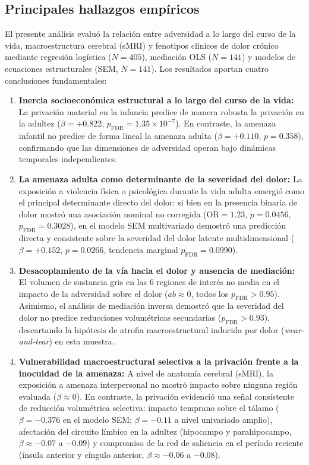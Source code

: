 \documentclass[11pt,a4paper]{article}
\begin{document}
\subsection{Principales hallazgos empíricos}
El presente análisis evaluó la relación entre adversidad a lo largo del curso de la vida, macroestructura cerebral (sMRI) y fenotipos clínicos de dolor crónico 
mediante regresión logística ($N = 405$), mediación OLS ($N = 141$) y modelos de ecuaciones estructurales (SEM, $N = 141$). Los resultados aportan cuatro conclusiones 
fundamentales: 
\begin{enumerate}
  \item \textbf{Inercia socioeconómica estructural a lo largo del curso de la vida:} La privación material en la infancia predice de manera robusta la privación en la 
  adultez ($\beta = +0.822$, $p_{\text{FDR}} = 1.35 \times 10^{-7}$). En contraste, la amenaza infantil no predice de forma lineal la amenaza adulta ($\beta = +0.110$, $p = 0.358$),
  confirmando que las dimensiones de adversidad operan bajo dinámicas temporales independientes. 
  \item \textbf{La amenaza adulta como determinante de la severidad del dolor:} La exposición a violencia física o psicológica durante la vida adulta emergió como el 
  principal determinante directo del dolor: si bien en la presencia binaria de dolor mostró una asociación nominal no corregida ($\text{OR} = 1.23$, $p = 0.0456$, $p_{\text{FDR}} = 0.3028$),
  en el modelo SEM multivariado demostró una predicción directa y consistente sobre la severidad del dolor latente multidimensional ($\beta = +0.152$, $p = 0.0266$, tendencia marginal $p_{\text{FDR}} = 0.0990$).
  \item \textbf{Desacoplamiento de la vía hacia el dolor y ausencia de mediación:} El volumen de sustancia gris en las 6 regiones de interés no media en el impacto de la adversidad sobre el dolor ($ab \approx 0$, todos los $p_{\text{FDR}} > 0.95$).
  Asimismo, el análisis de mediación inversa demostró que la severidad del dolor no predice reducciones volumétricas secundarias ($p_{\text{FDR}} > 0.93$), descartando la hipótesis de atrofia macroestructural 
  inducida por dolor (\textit{wear-and-tear}) en esta muestra. 
  \item \textbf{Vulnerabilidad macroestructural selectiva a la privación frente a la inocuidad de la amenaza:} A nivel de anatomía cerebral (sMRI), la exposición a amenaza interpersonal no mostró impacto sobre ninguna 
  región evaluada ($\beta \approx 0$). En contraste, la privación evidenció una señal consistente de reducción volumétrica selectiva: impacto temprano sobre el tálamo ($\beta = -0.376$ en el modelo SEM; $\beta = -0.11$ a nivel univariado amplio),
  afectación del circuito límbico en la adultez (hipocampo y parahipocampo, $\beta \approx -0.07$ a $-0.09$) y compromiso de la red de saliencia en el período reciente (ínsula anterior y cíngulo anterior, $\beta \approx -0.06$ a $-0.08$).
\end{enumerate}
\end{document}
